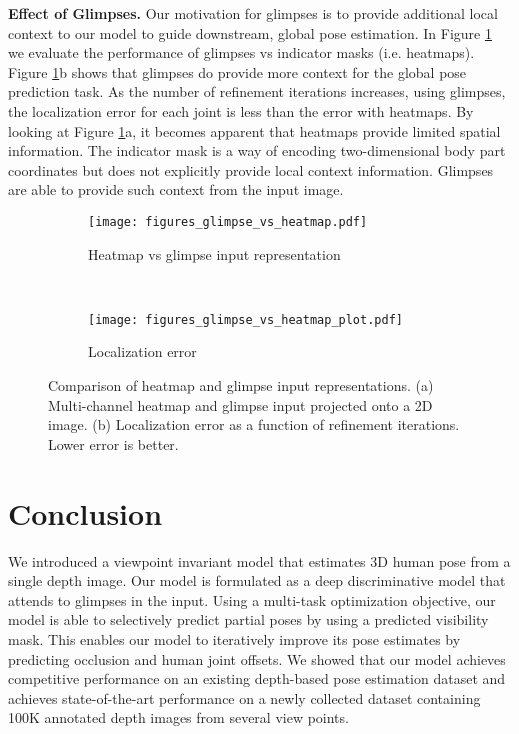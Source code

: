 \documentclass[runningheads]{llncs}
\begin{document}
	\textbf{Effect of Glimpses.}
	Our motivation for glimpses is to provide additional local context to our model to guide downstream, global pose estimation. In Figure \ref{fig:glimpse_vs_heatmap} we evaluate the performance of glimpses vs indicator masks (i.e. heatmaps). Figure \ref{fig:glimpse_vs_heatmap}b shows that glimpses do provide more context for the global pose prediction task. As the number of refinement iterations increases, using glimpses, the localization error for each joint is less than the error with heatmaps. By looking at Figure \ref{fig:glimpse_vs_heatmap}a, it becomes apparent that heatmaps provide limited spatial information. The indicator mask is a way of encoding two-dimensional body part coordinates but does not explicitly provide local context information. Glimpses are able to provide such context from the input image.

	\begin{figure}[t]
		\centering
		\begin{subfigure}[b]{0.59\textwidth}
			\texttt{[image: figures\_glimpse\_vs\_heatmap.pdf]}
			\caption{Heatmap vs glimpse input representation}
		\end{subfigure}
		~
		\begin{subfigure}[b]{0.38\textwidth}
			\texttt{[image: figures\_glimpse\_vs\_heatmap\_plot.pdf]}
			\caption{Localization error}
		\end{subfigure}
		\caption{Comparison of heatmap and glimpse input representations. (a) Multi-channel heatmap and glimpse input projected onto a 2D image. (b) Localization error as a function of refinement iterations. Lower error is better.}\label{fig:glimpse_vs_heatmap}
	\end{figure}

	\section{Conclusion}
	We introduced a viewpoint invariant model that estimates 3D human pose from a single depth image. Our model is formulated as a deep discriminative model that attends to glimpses in the input. Using a multi-task optimization objective, our model is able to selectively predict partial poses by using a predicted visibility mask. This enables our model to iteratively improve its pose estimates by predicting occlusion and human joint offsets. We showed that our model achieves competitive performance on an existing depth-based pose estimation dataset and achieves state-of-the-art performance on a newly collected dataset containing 100K annotated depth images from several view points.
\end{document}
